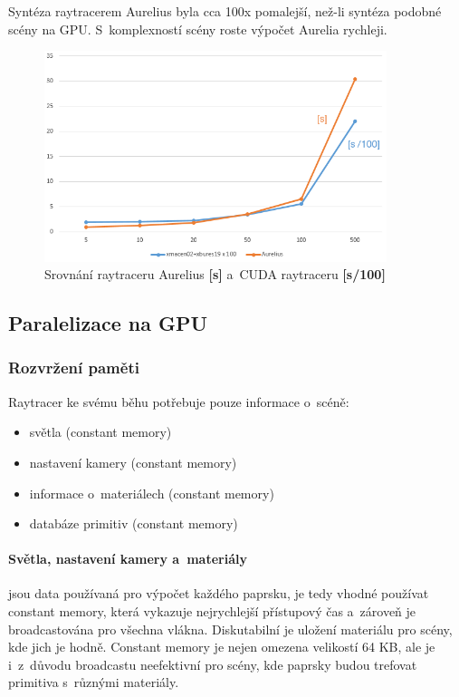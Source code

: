 \documentclass[12pt,a4paper,titlepage,final]{report}
\begin{document}
Syntéza raytracerem Aurelius byla cca 100x pomalejší, než-li syntéza podobné scény na GPU. S~komplexností scény roste výpočet Aurelia rychleji.


\begin{figure}[ht]
\begin{center}
\includegraphics[width=10cm]{images/srovnani.png}
\caption{Srovnání raytraceru Aurelius \textbf{[s]} a~CUDA raytraceru \textbf{[s/100]}}
\end{center}
\end{figure}

\subsection{Paralelizace na GPU}

\subsubsection{Rozvržení paměti} 

Raytracer ke svému běhu potřebuje pouze informace o~scéně:
\begin{itemize}
	\item světla (constant memory)
	\item nastavení kamery (constant memory)
	\item informace o~materiálech (constant memory)
	\item databáze primitiv (constant memory)
\end{itemize}

\paragraph{Světla, nastavení kamery a~materiály} jsou data používaná pro výpočet každého paprsku, je tedy vhodné používat constant memory, která vykazuje nejrychlejší přístupový čas a~zároveň je broadcastována pro všechna vlákna. Diskutabilní je uložení materiálu pro scény, kde jich je hodně. Constant memory je nejen omezena velikostí 64 KB, ale je i~z~důvodu broadcastu neefektivní pro scény, kde paprsky budou trefovat primitiva s~různými materiály.
\end{document}
